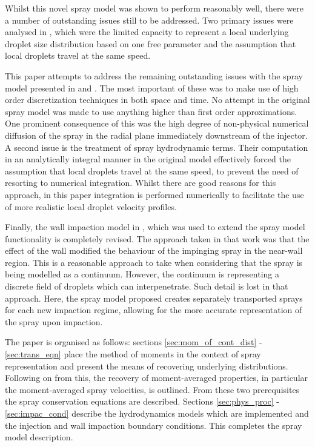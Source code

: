 \documentclass[a4paper,10pt]{article}
\begin{document}
Whilst this novel spray model was shown to perform reasonably well, there were a number of outstanding issues still to be addressed. Two primary issues were analysed in \cite{jones2011}, which were the limited capacity to represent a local underlying droplet size distribution based on one free parameter and the assumption that local droplets travel at the same speed.

This paper attempts to address the remaining outstanding issues with the spray model presented in \cite{beck2003} and \cite{lemini2004}. The most important of these was to make use of high order discretization techniques in both space and time. No attempt in the original spray model was made to use anything higher than first order approximations. One prominent consequence of this was the high degree of non-physical numerical diffusion of the spray in the radial plane immediately downstream of the injector. A second issue is the treatment of spray hydrodynamic terms. Their computation in an analytically integral manner in the original model effectively forced the assumption that local droplets travel at the same speed, to prevent the need of resorting to numerical integration. Whilst there are good reasons for this approach, in this paper integration is performed numerically to facilitate the use of more realistic local droplet velocity profiles.

Finally, the wall impaction model in \cite{lemini2004}, which was used to extend the spray model functionality is completely revised. The approach taken in that work was that the effect of the wall modified the behaviour of the impinging spray in the near-wall region. This is a reasonable approach to take when considering that the spray is being modelled as a continuum. However, the continuum is representing a discrete field of droplets which can interpenetrate. Such detail is lost in that approach. Here, the spray model proposed creates separately transported sprays for each new impaction regime, allowing for the more accurate representation of the spray upon impaction.


The paper is organised as follows: sections \ref{sec:mom_of_cont_dist} - \ref{sec:trans_eqn} place the method of moments in the context of spray representation and present the means of recovering underlying distributions. Following on from this, the recovery of moment-averaged properties, in particular the moment-averaged spray velocities, is outlined. From these two prerequisites the spray conservation equations are described. Sections \ref{sec:phys_proc} - \ref{sec:impac_cond} describe the hydrodynamics models which are implemented and the injection and wall impaction boundary conditions. This completes the spray model description.
\end{document}
